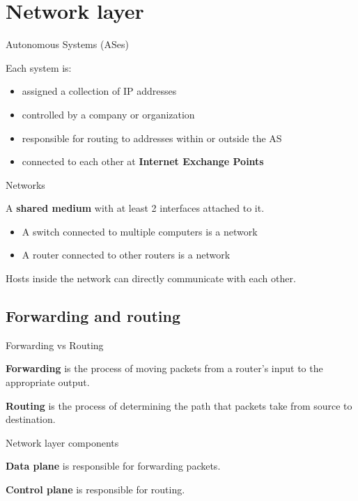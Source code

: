 \section{Network layer}

\begin{definition}
    {Autonomous Systems (ASes)}

    Each system is:
    \begin{itemize}
        \item assigned a collection of IP addresses
        \item controlled by a company or organization
        \item responsible for routing to addresses within or outside the AS
        \item connected to each other at \textbf{Internet Exchange Points}
    \end{itemize}
\end{definition}

\begin{definition}
    {Networks}

    A \textbf{shared medium} with at least 2 interfaces attached to it.
    \begin{itemize}
        \item A switch connected to multiple computers is a network
        \item A router connected to other routers is a network
    \end{itemize}
    Hosts inside the network can directly communicate with each other.
\end{definition}


\subsection{Forwarding and routing}

\begin{definition}
    {Forwarding vs Routing}

    \textbf{Forwarding} is the process of moving packets from a router's input to the appropriate output.

    \textbf{Routing} is the process of determining the path that packets take from source to destination.
\end{definition}

\begin{definition}
    {Network layer components}

    \textbf{Data plane} is responsible for forwarding packets.

    \textbf{Control plane} is responsible for routing.
\end{definition}

